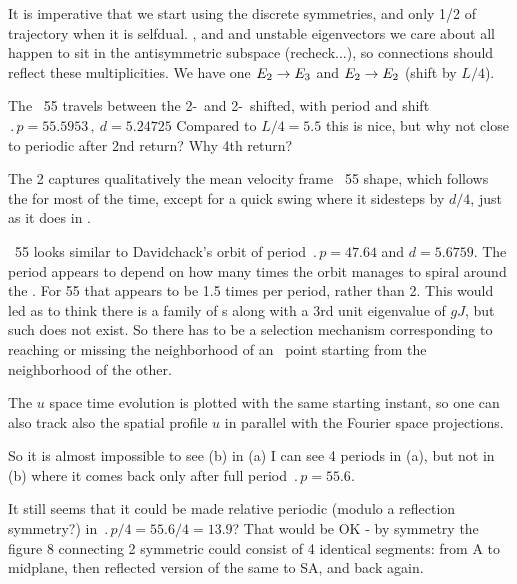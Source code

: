 It is imperative that we start using the discrete symmetries, and only 1/2
of trajectory when it is selfdual.
,  and  and unstable eigenvectors
we care about all happen to sit in the antisymmetric subspace
(recheck...), so connections should reflect these multiplicities. We have
one $E_{2} \to E_{3}$ and $E_{2} \to E_{2}$ (shift by $L/4$).

The \rpo\ {\nameit}55 travels between the 2-\eqv\  and
2-\eqv\ shifted,
with period and shift
$\period{p}=55.5953\,,\ d=5.24725$
Compared to $L/4 = 5.5$
this is nice, but why not close to periodic after 2nd return? Why 4th return?

The {\nameit}2 {\eqv}
captures qualitatively the mean velocity frame \rpo\ {\nameit}55 shape,
which follows the
{\eqv} for most of the time, except for a quick swing where it
sidesteps by $d/4$, just as it does in .

\Rpo\ {\nameit}55 looks similar to Davidchack's  orbit
of period
$\period{p}=47.64$ and $d=5.6759$. The period appears to depend on how
many times the orbit manages to spiral around the \eqv.
For {\nameit}55 that appears to be
1.5 times per period, rather than 2. This would led as
to
think there is a family of \rpo s along with a 3rd unit eigenvalue of
$gJ$,
but such does not exist.
So there has to be a selection mechanism corresponding to
reaching or missing the neighborhood of an \eqv\  point starting from
the neighborhood of the other.

The $u$ space time evolution  %
is plotted with the same starting instant,
so one can also track also the spatial profile $u$ in parallel with
the Fourier space projections.

So it is almost impossible to see (b) %
in (a) %
I can see 4 periods in (a), %
but not in (b) %
where it comes back only after full period $\period{p}=55.6$.

It still seems that it could be made relative periodic
(modulo a reflection symmetry?)
in $\period{p}/4=55.6/4=13.9$? That would be OK
-
by symmetry the figure 8 connecting
2 symmetric {\eqva} could consist of 4 identical segments: from
{\eqv} A to midplane, then reflected version of the same to SA, and
back again.

